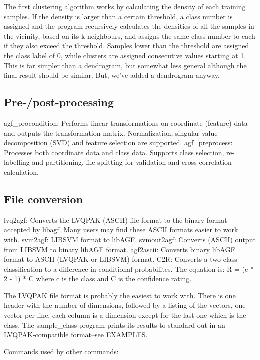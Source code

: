 \documentclass[12pt]{article}
\begin{document}
  The first clustering algorithm works by calculating the density of each training samples.  If the density is larger than a certain threshold, a class number is assigned and the program recursively calculates the densities of all the samples in the vicinity, based on its k neighbours, and assigns the same class number to each if they also exceed the threshold.  Samples lower than the threshold are assigned the class label of 0, while clusters are assigned consecutive values starting at 1.  This is far simpler than a dendrogram, but somewhat less general although the final result should be similar.  But, we've added a dendrogram anyway.

\subsection{Pre-/post-processing}

  agf_procondition:	Performs linear transformations on coordinate (feature) data and outputs the transformation matrix.  Normalization, singular-value-decomposition (SVD) and feature selection are supported.
  agf_preprocess:	Processes both coordinate data and class data.  Supports class selection, re-labelling and partitioning, file splitting for validation and cross-correlation calculation.

\subsection{File conversion}

  lvq2agf:	Converts the LVQPAK (ASCII) file format to the binary format accepted by libagf.  Many users may find these ASCII formats easier to work with.
  svm2agf:	LIBSVM format to libAGF.
  svmout2agf:	Converts (ASCII) output from LIBSVM to binary libAGF format.
  agf2ascii:	Converts binary libAGF format to ASCII (LVQPAK or LIBSVM)  format.
  C2R:		Converts a two-class classification to a difference in conditional probabilites.
		The equation is:
			R = (c * 2 - 1) * C
		where c is the class and C is the confidence rating.

  The LVQPAK file format is probably the easiest to work with.  There is one header with the number of dimensions, followed by a listing of the vectors, one vector per line, each column is a dimension except for the last one which is the class.  The sample_class program prints its results to standard out in an LVQPAK-compatible format--see EXAMPLES.

Commands used by other commands:
\end{document}
